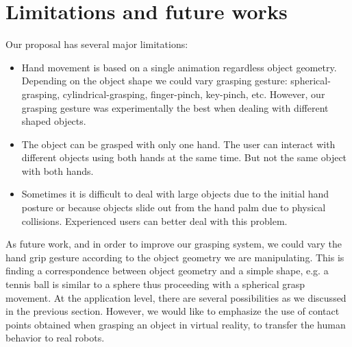 \section{Limitations and future works}
\label{sec:limitationsfutureworks}
Our proposal has several major limitations:
\begin{itemize}
	\item Hand movement is based on a single animation regardless object geometry. Depending on the object shape we could vary grasping gesture: spherical-grasping, cylindrical-grasping, finger-pinch, key-pinch, etc. However, our grasping gesture was experimentally the best when dealing with different shaped objects. 
	\item The object can be grasped with only one hand. The user can interact with different objects using both hands at the same time. But not the same object with both hands. 
	\item Sometimes it is difficult to deal with large objects due to the initial hand posture or because objects slide out from the hand palm due to physical collisions. Experienced users can better deal with this problem.
\end{itemize}

As future work, and in order to improve our grasping system, we could vary the hand grip gesture according to the object geometry we are manipulating. This is finding a correspondence between object geometry and a simple shape, e.g. a tennis ball is similar to a sphere thus proceeding with a spherical grasp movement. At the application level, there are several possibilities as we discussed in the previous section. However, we would like to emphasize the use of contact points obtained when grasping an object in virtual reality, to transfer the human behavior to real robots.


